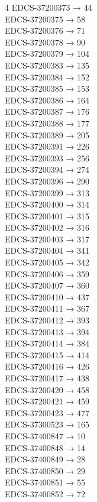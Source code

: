 \begin{multicols}{4}
EDCS-37200373 → 44\\
EDCS-37200375 → 58\\
EDCS-37200376 → 71\\
EDCS-37200378 → 90\\
EDCS-37200379 → 104\\
EDCS-37200383 → 135\\
EDCS-37200384 → 152\\
EDCS-37200385 → 153\\
EDCS-37200386 → 164\\
EDCS-37200387 → 176\\
EDCS-37200388 → 177\\
EDCS-37200389 → 205\\
EDCS-37200391 → 226\\
EDCS-37200393 → 256\\
EDCS-37200394 → 274\\
EDCS-37200396 → 290\\
EDCS-37200399 → 313\\
EDCS-37200400 → 314\\
EDCS-37200401 → 315\\
EDCS-37200402 → 316\\
EDCS-37200403 → 317\\
EDCS-37200404 → 341\\
EDCS-37200405 → 342\\
EDCS-37200406 → 359\\
EDCS-37200407 → 360\\
EDCS-37200410 → 437\\
EDCS-37200411 → 367\\
EDCS-37200412 → 393\\
EDCS-37200413 → 394\\
EDCS-37200414 → 384\\
EDCS-37200415 → 414\\
EDCS-37200416 → 426\\
EDCS-37200417 → 438\\
EDCS-37200420 → 458\\
EDCS-37200421 → 459\\
EDCS-37200423 → 477\\
EDCS-37300523 → 165\\
EDCS-37400847 → 10\\
EDCS-37400848 → 14\\
EDCS-37400849 → 28\\
EDCS-37400850 → 29\\
EDCS-37400851 → 55\\
EDCS-37400852 → 72\\

\end{multicols}
